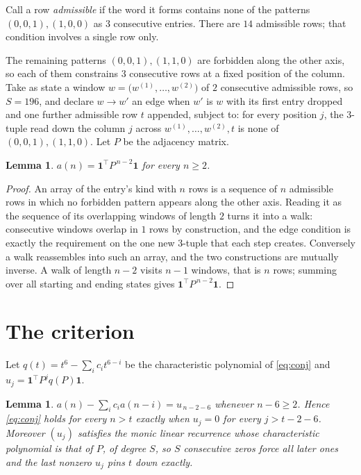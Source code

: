 \documentclass[11pt,a4paper]{article}
\theoremstyle{plain}
\newtheorem{lemma}[theorem]{Lemma}
\theoremstyle{definition}
\begin{document}
Call a row \emph{admissible} if the word it forms contains none of the patterns
$(0,0,1), (1,0,0)$ as $3$ consecutive entries. There are $14$ admissible rows; that condition
involves a single row only.

The remaining patterns $(0,0,1), (1,1,0)$ are forbidden along the other axis, so each of them
constrains $3$ consecutive rows at a fixed position of the column. Take as state a
window $w=\bigl(w^{(1)},\dots,w^{(2)}\bigr)$ of $2$ consecutive admissible
rows, so $S=196$, and declare $w\to w'$ an edge when $w'$ is $w$ with its first entry
dropped and one further admissible row $t$ appended, subject to: for every position
$j$, the $3$-tuple read down the column $j$ across $w^{(1)},\dots,w^{(2)},t$
is none of $(0,0,1), (1,1,0)$. Let $P$ be the adjacency matrix.

\begin{lemma}\label{lem:walk}
$a(n)=\mathbf{1}^{\!\top}P^{\,n-2}\mathbf{1}$ for every $n\ge2$.
\end{lemma}

\begin{proof}
An array of the entry's kind with $n$ rows is a sequence of $n$ admissible rows in
which no forbidden pattern appears along the other axis. Reading it as the sequence of its
overlapping windows of length $2$ turns it into a walk: consecutive windows overlap in
$1$ rows by construction, and the edge condition is exactly the requirement on the one
new $3$-tuple that each step creates. Conversely a walk reassembles into such an array,
and the two constructions are mutually inverse. A walk of length $n-2$ visits $n-1$
windows, that is $n$ rows; summing over all starting and ending states gives
$\mathbf{1}^{\!\top}P^{\,n-2}\mathbf{1}$.
\end{proof}

\section{The criterion}

Let $q(t)=t^{6}-\sum_i c_i t^{6-i}$ be the characteristic polynomial of
\eqref{eq:conj} and $u_j=\mathbf{1}^{\!\top}P^{j}q(P)\mathbf{1}$.

\begin{lemma}\label{lem:crit}
$a(n)-\sum_i c_i a(n-i)=u_{\,n-2-6}$ whenever $n-6\ge2$. Hence
\eqref{eq:conj} holds for every $n>t$ exactly when $u_j=0$ for every
$j>t-2-6$. Moreover $(u_j)$ satisfies the monic linear recurrence whose
characteristic polynomial is that of $P$, of degree $S$, so $S$ consecutive zeros force all
later ones and the last nonzero $u_j$ pins $t$ down exactly.
\end{lemma}
\end{document}
